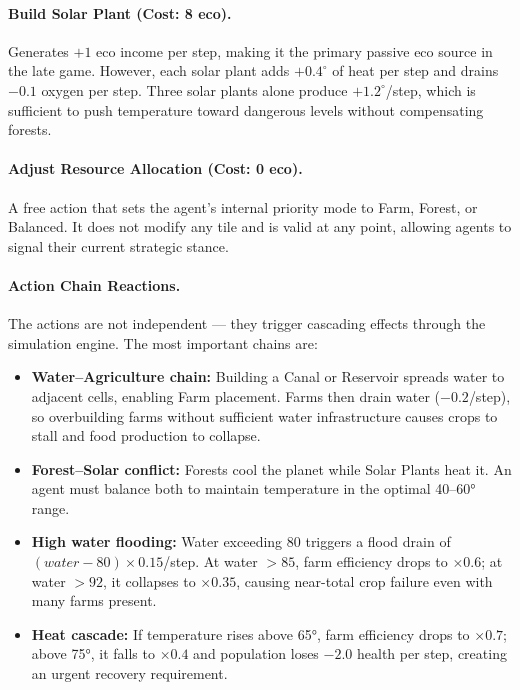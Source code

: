 \documentclass[12pt,a4paper]{article}
\begin{document}
\paragraph{Build Solar Plant (Cost: 8 eco).} Generates $+1$ eco income per step, making it the primary passive eco source in the late game. However, each solar plant adds $+0.4^\circ$ of heat per step and drains $-0.1$ oxygen per step. Three solar plants alone produce $+1.2^\circ$/step, which is sufficient to push temperature toward dangerous levels without compensating forests.

\paragraph{Adjust Resource Allocation (Cost: 0 eco).} A free action that sets the agent's internal priority mode to Farm, Forest, or Balanced. It does not modify any tile and is valid at any point, allowing agents to signal their current strategic stance.

\paragraph{Action Chain Reactions.}
The actions are not independent — they trigger cascading effects through the simulation engine. The most important chains are:

\begin{itemize}[leftmargin=1.5cm]
    \item \textbf{Water–Agriculture chain:} Building a Canal or Reservoir spreads water to adjacent cells, enabling Farm placement. Farms then drain water ($-0.2$/step), so overbuilding farms without sufficient water infrastructure causes crops to stall and food production to collapse.
    \item \textbf{Forest–Solar conflict:} Forests cool the planet while Solar Plants heat it. An agent must balance both to maintain temperature in the optimal 40–60° range.
    \item \textbf{High water flooding:} Water exceeding 80 triggers a flood drain of $(water - 80) \times 0.15$/step. At water $> 85$, farm efficiency drops to $\times 0.6$; at water $> 92$, it collapses to $\times 0.35$, causing near-total crop failure even with many farms present.
    \item \textbf{Heat cascade:} If temperature rises above 65°, farm efficiency drops to $\times 0.7$; above 75°, it falls to $\times 0.4$ and population loses $-2.0$ health per step, creating an urgent recovery requirement.
\end{itemize}
\end{document}
